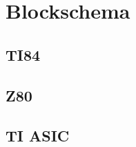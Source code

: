 \documentclass[12pt]{article}
\begin{document}
\section{Blockschema}
\subsection{TI84}
\begin{figure}[H]
    \centering
    \def\svgwidth{0.9\columnwidth}
    
\end{figure}
\subsection{Z80}
\begin{figure}[H]
    \centering
    \def\svgwidth{0.87\columnwidth}
    
\end{figure}
\subsection{TI ASIC}
\begin{figure}[H]
    \centering
    \def\svgwidth{1.2\columnwidth}
    
\end{figure}
\end{document}
